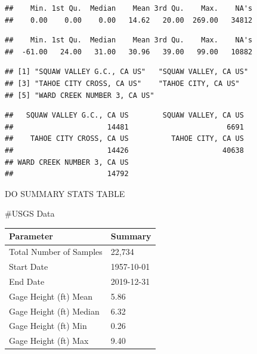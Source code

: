 \documentclass[]{article}
\newenvironment{Shaded}{\begin{snugshade}}{\end{snugshade}}
\newcommand{\CommentTok}[1]{\textcolor[rgb]{0.56,0.35,0.01}{\textit{#1}}}
\newcommand{\KeywordTok}[1]{\textcolor[rgb]{0.13,0.29,0.53}{\textbf{#1}}}
\newcommand{\NormalTok}[1]{#1}
\newcommand{\OperatorTok}[1]{\textcolor[rgb]{0.81,0.36,0.00}{\textbf{#1}}}
\begin{document}
\begin{verbatim}
##    Min. 1st Qu.  Median    Mean 3rd Qu.    Max.    NA's 
##    0.00    0.00    0.00   14.62   20.00  269.00   34812
\end{verbatim}

\begin{Shaded}
\end{Shaded}

\begin{verbatim}
##    Min. 1st Qu.  Median    Mean 3rd Qu.    Max.    NA's 
##  -61.00   24.00   31.00   30.96   39.00   99.00   10882
\end{verbatim}

\begin{Shaded}
\end{Shaded}

\begin{verbatim}
## [1] "SQUAW VALLEY G.C., CA US"   "SQUAW VALLEY, CA US"       
## [3] "TAHOE CITY CROSS, CA US"    "TAHOE CITY, CA US"         
## [5] "WARD CREEK NUMBER 3, CA US"
\end{verbatim}

\begin{Shaded}
\end{Shaded}

\begin{verbatim}
##   SQUAW VALLEY G.C., CA US        SQUAW VALLEY, CA US 
##                      14481                       6691 
##    TAHOE CITY CROSS, CA US          TAHOE CITY, CA US 
##                      14426                      40638 
## WARD CREEK NUMBER 3, CA US 
##                      14792
\end{verbatim}

DO SUMMARY STATS TABLE

\#USGS Data

\begin{longtable}[]{@{}ll@{}}
\toprule
Parameter & Summary\tabularnewline
\midrule
\endhead
Total Number of Samples & 22,734\tabularnewline
Start Date & 1957-10-01\tabularnewline
End Date & 2019-12-31\tabularnewline
Gage Height (ft) Mean & 5.86\tabularnewline
Gage Height (ft) Median & 6.32\tabularnewline
Gage Height (ft) Min & 0.26\tabularnewline
Gage Height (ft) Max & 9.40\tabularnewline
\bottomrule
\end{longtable}
\end{document}
